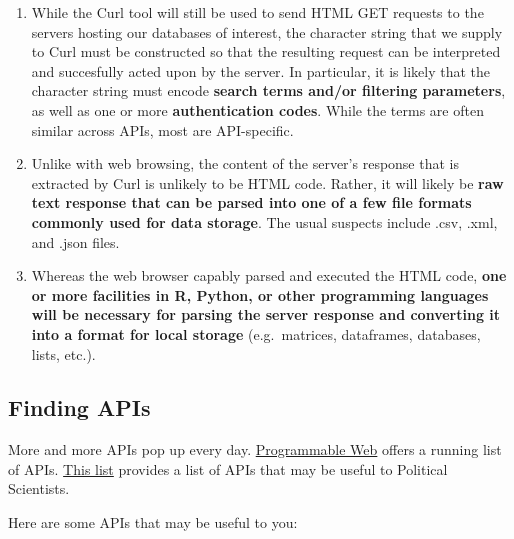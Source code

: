\documentclass[]{book}
\begin{document}
\begin{enumerate}
\def\labelenumi{\arabic{enumi}.}
\item
  While the Curl tool will still be used to send HTML GET requests to the servers hosting our databases of interest, the character string that we supply to Curl must be constructed so that the resulting request can be interpreted and succesfully acted upon by the server. In particular, it is likely that the character string must encode \textbf{search terms and/or filtering parameters}, as well as one or more \textbf{authentication codes}. While the terms are often similar across APIs, most are API-specific.
\item
  Unlike with web browsing, the content of the server's response that is extracted by Curl is unlikely to be HTML code. Rather, it will likely be \textbf{raw text response that can be parsed into one of a few file formats commonly used for data storage}. The usual suspects include .csv, .xml, and .json files.
\item
  Whereas the web browser capably parsed and executed the HTML code, \textbf{one or more facilities in R, Python, or other programming languages will be necessary for parsing the server response and converting it into a format for local storage} (e.g.~matrices, dataframes, databases, lists, etc.).
\end{enumerate}

\hypertarget{finding-apis}{%
\subsection{Finding APIs}\label{finding-apis}}

More and more APIs pop up every day. \href{https://www.programmableweb.com/apis/directory}{Programmable Web} offers a running list of APIs. \href{https://ucsd.libguides.com/c.php?g=90743\&p=3202435}{This list} provides a list of APIs that may be useful to Political Scientists.

Here are some APIs that may be useful to you:
\end{document}
